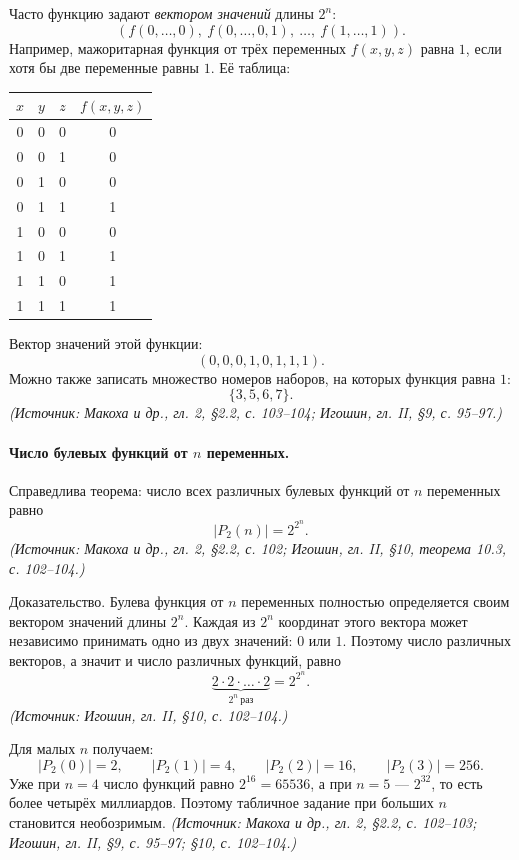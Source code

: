 \documentclass[a4paper,12pt]{article}
\begin{document}
Часто функцию задают \emph{вектором значений} длины \(2^n\):
\[
(f(0,\ldots,0),\ f(0,\ldots,0,1),\ \ldots,\ f(1,\ldots,1)).
\]
Например, мажоритарная функция от трёх переменных \(f(x,y,z)\) равна \(1\), если хотя бы две переменные равны \(1\). Её таблица:
\begin{center}
\begin{tabular}{ccc|c}
\toprule
\(x\) & \(y\) & \(z\) & \(f(x,y,z)\)\\
\midrule
0 & 0 & 0 & 0\\
0 & 0 & 1 & 0\\
0 & 1 & 0 & 0\\
0 & 1 & 1 & 1\\
1 & 0 & 0 & 0\\
1 & 0 & 1 & 1\\
1 & 1 & 0 & 1\\
1 & 1 & 1 & 1\\
\bottomrule
\end{tabular}
\end{center}
Вектор значений этой функции:
\[
(0,0,0,1,0,1,1,1).
\]
Можно также записать множество номеров наборов, на которых функция равна \(1\):
\[
\{3,5,6,7\}.
\]
\textit{(Источник: Макоха и др., гл. 2, §2.2, с. 103--104; Игошин, гл. II, §9, с. 95--97.)}

\paragraph{Число булевых функций от \(n\) переменных.}
Справедлива теорема: число всех различных булевых функций от \(n\) переменных равно
\[
|P_2(n)|=2^{2^n}.
\]
\textit{(Источник: Макоха и др., гл. 2, §2.2, с. 102; Игошин, гл. II, §10, теорема 10.3, с. 102--104.)}

Доказательство. Булева функция от \(n\) переменных полностью определяется своим вектором значений длины \(2^n\). Каждая из \(2^n\) координат этого вектора может независимо принимать одно из двух значений: \(0\) или \(1\). Поэтому число различных векторов, а значит и число различных функций, равно
\[
\underbrace{2\cdot 2\cdot\ldots\cdot 2}_{2^n\ \text{раз}}=2^{2^n}.
\]
\textit{(Источник: Игошин, гл. II, §10, с. 102--104.)}

Для малых \(n\) получаем:
\[
|P_2(0)|=2,\qquad
|P_2(1)|=4,\qquad
|P_2(2)|=16,\qquad
|P_2(3)|=256.
\]
Уже при \(n=4\) число функций равно \(2^{16}=65536\), а при \(n=5\) — \(2^{32}\), то есть более четырёх миллиардов. Поэтому табличное задание при больших \(n\) становится необозримым.
\textit{(Источник: Макоха и др., гл. 2, §2.2, с. 102--103; Игошин, гл. II, §9, с. 95--97; §10, с. 102--104.)}
\end{document}
